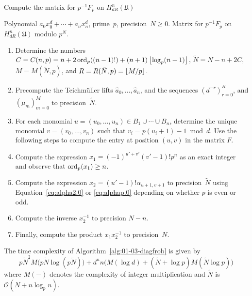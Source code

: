 \begin{algorithm}
\caption{Compute the matrix for $p^{-1} F_p$ on $H_{dR}^n(\mathfrak{U})$}
\label{alg:01-03-diagfrob}
\begin{algorithmic}
\vspace{1mm}
\Require Polynomial $a_0 x_0^d + \dotsb + a_n x_n^d$, 
         prime~$p$, precision~$N \geq 0$.
\Ensure  Matrix for $p^{-1} F_p$ on $H_{dR}^n(\mathfrak{U})$ modulo $p^N$.
\begin{enumerate}
\item Determine the numbers 
      $C = C(n,p) = n + 2 \operatorname{ord}_p((n-1)!) + (n+1) \left\lfloor\log_p(n-1)\right\rfloor$, 
      $\tilde{N} = N - n + 2 C$, $M = M(\tilde{N}, p)$, and 
      $R = R(\tilde{N}, p) = \left\lfloor M/p\right\rfloor$.
\item Precompute the Teichm\"uller lifts $\hat{a}_0, \dotsc, \hat{a}_n$, 
      and the sequences $(d^{-r})_{r=0}^R$, and $(\mu_m)_{m=0}^{M}$ 
      to precision~$\tilde{N}$.
\item For each monomial $u = (u_0, \dotsc, u_n) \in B_1 \cup \dotsb \cup B_n$, 
      determine the unique monomial $v = (v_0, \dotsc, v_n)$ such that 
      $v_i = p (u_i + 1) - 1 \bmod{d}$.  Use the following steps to 
      compute the entry at position $(u,v)$ in the matrix $F$.
\item Compute the expression $x_1 = (-1)^{u'+v'} (v'-1)! p^n$ as an 
      exact integer and observe that \mbox{$\operatorname{ord}_p(x_1) \geq n$}.
\item Compute the expression $x_2 = (u' - 1)! \alpha_{u+1,v+1}$ to 
      precision~$\tilde{N}$ using Equation~\eqref{eq:alpha2.0} or 
      \eqref{eq:alphap.0} depending on whether $p$ is even or odd. 
\item Compute the inverse $x_2^{-1}$ to precision $N - n$.
\item Finally, compute the product $x_1 x_2^{-1}$ to precision~$N$.
\end{enumerate}
\EndProcedure
\end{algorithmic}
\end{algorithm}

\begin{thm} \label{thm:01-dm-03-complexity}
The time complexity of Algorithm~\ref{alg:01-03-diagfrob} is given 
by 
\begin{equation*}
p \tilde{N}^2 M\bigl(p \tilde{N} \log (p \tilde{N})\bigr)
    + d^n n \bigl( M(\log d) + (\tilde{N} + \log p) M(\tilde{N} \log p) \bigr)
\end{equation*}
where $M(-)$ denotes the complexity of integer multiplication and 
$\tilde{N}$ is $\mathcal{O}(N + n \log_p n)$.
\end{thm}

